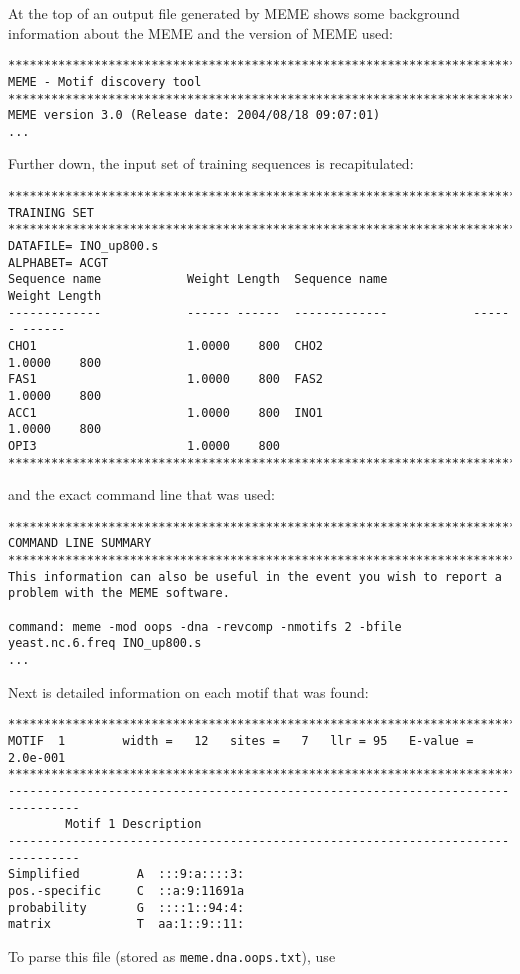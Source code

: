 At the top of an output file generated by MEME shows some background information
about the MEME and the version of MEME used:
\begin{verbatim}
********************************************************************************
MEME - Motif discovery tool
********************************************************************************
MEME version 3.0 (Release date: 2004/08/18 09:07:01)
...
\end{verbatim}
Further down, the input set of training sequences is recapitulated:
\begin{verbatim}
********************************************************************************
TRAINING SET
********************************************************************************
DATAFILE= INO_up800.s
ALPHABET= ACGT
Sequence name            Weight Length  Sequence name            Weight Length
-------------            ------ ------  -------------            ------ ------
CHO1                     1.0000    800  CHO2                     1.0000    800
FAS1                     1.0000    800  FAS2                     1.0000    800
ACC1                     1.0000    800  INO1                     1.0000    800
OPI3                     1.0000    800
********************************************************************************
\end{verbatim}
and the exact command line that was used:
\begin{verbatim}
********************************************************************************
COMMAND LINE SUMMARY
********************************************************************************
This information can also be useful in the event you wish to report a
problem with the MEME software.

command: meme -mod oops -dna -revcomp -nmotifs 2 -bfile yeast.nc.6.freq INO_up800.s
...
\end{verbatim}
Next is detailed information on each motif that was found:
\begin{verbatim}
********************************************************************************
MOTIF  1        width =   12   sites =   7   llr = 95   E-value = 2.0e-001
********************************************************************************
--------------------------------------------------------------------------------
        Motif 1 Description
--------------------------------------------------------------------------------
Simplified        A  :::9:a::::3:
pos.-specific     C  ::a:9:11691a
probability       G  ::::1::94:4:
matrix            T  aa:1::9::11:
\end{verbatim}
To parse this file (stored as \verb+meme.dna.oops.txt+), use

